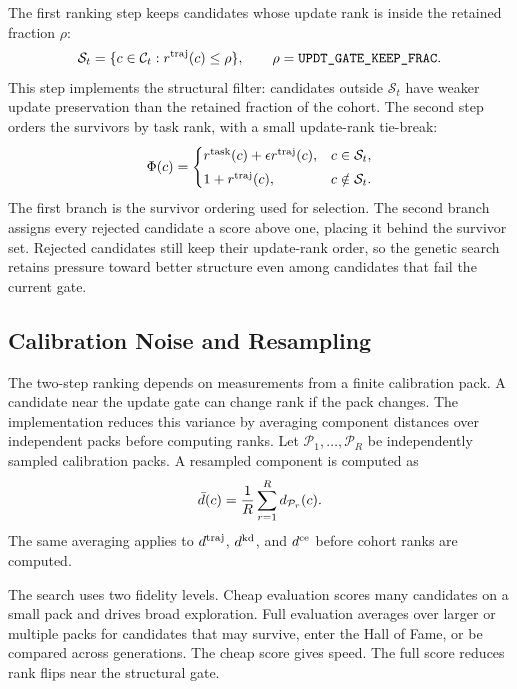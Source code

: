 The first ranking step keeps candidates whose update rank is inside the retained fraction $\rho$:
\[
\mathcal{S}_t
=
\{c\in\mathcal{C}_t : r^{\mathrm{traj}}(c)\le\rho\},
\qquad
\rho=\texttt{UPDT\_GATE\_KEEP\_FRAC}.
\]
This step implements the structural filter: candidates outside $\mathcal{S}_t$ have weaker update preservation than the retained fraction of the cohort. The second step orders the survivors by task rank, with a small update-rank tie-break:
\begin{equation}
\Phi(c)=
\begin{cases}
r^{\mathrm{task}}(c)+\epsilon r^{\mathrm{traj}}(c),
& c\in\mathcal{S}_t,\\[3pt]
1+r^{\mathrm{traj}}(c),
& c\notin\mathcal{S}_t .
\end{cases}
\label{eq:final_score}
\end{equation}
The first branch is the survivor ordering used for selection. The second branch assigns every rejected candidate a score above one, placing it behind the survivor set. Rejected candidates still keep their update-rank order, so the genetic search retains pressure toward better structure even among candidates that fail the current gate.

\subsection{Calibration Noise and Resampling}

The two-step ranking depends on measurements from a finite calibration pack. A candidate near the update gate can change rank if the pack changes. The implementation reduces this variance by averaging component distances over independent packs before computing ranks. Let $\mathcal{P}_1,\ldots,\mathcal{P}_R$ be independently sampled calibration packs. A resampled component is computed as
\begin{equation}
\bar d(c)
=
\frac{1}{R}
\sum_{r=1}^{R}
d_{\mathcal{P}_r}(c).
\label{eq:metric_resample}
\end{equation}
The same averaging applies to $d^{\mathrm{traj}}$, $d^{\mathrm{kd}}$, and $d^{\mathrm{ce}}$ before cohort ranks are computed.

The search uses two fidelity levels. Cheap evaluation scores many candidates on a small pack and drives broad exploration. Full evaluation averages over larger or multiple packs for candidates that may survive, enter the Hall of Fame, or be compared across generations. The cheap score gives speed. The full score reduces rank flips near the structural gate.

